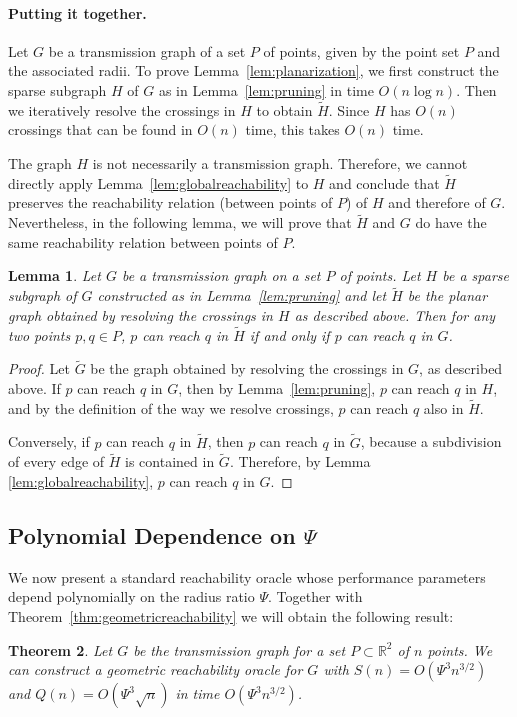 \documentclass[11pt,a4paper]{paper}
\newtheorem{theorem}{Theorem}[section]
\newtheorem{lemma}[theorem]{Lemma}
\newcommand{\mathset}[1]{\ensuremath {\mathbb {#1}}}
\newcommand{\R}{\mathset{R}}
\begin{document}
\paragraph*{Putting it together.}
Let $G$ be a transmission graph of a set $P$ of points, given 
by the point set $P$ and the associated radii.
To prove Lemma~\ref{lem:planarization}, we first construct the sparse
subgraph $H$ of $G$ as in Lemma~\ref{lem:pruning} in time $O(n \log n)$.
Then we iteratively resolve the crossings in $H$ to obtain
$\widetilde{H}$.
Since $H$ has $O(n)$ crossings that can be found in $O(n)$ time,
this takes $O(n)$ time.

The graph $H$ is not necessarily a transmission graph. Therefore, we cannot 
directly apply Lemma~\ref{lem:globalreachability} to $H$
and conclude that $\widetilde{H}$ preserves the reachability relation
(between points of $P$) of $H$ and therefore of
$G$. Nevertheless, in the following lemma, we will
prove  that $\widetilde{H}$ and $G$ do have the same reachability 
relation between points of $P$.
\begin{lemma}
Let $G$ be a transmission graph on a set $P$ of points. Let $H$ be a sparse subgraph of $G$ constructed  as in Lemma~\ref{lem:pruning}
and let $\widetilde{H}$ be the planar graph obtained by resolving the crossings in $H$ as described above.
Then for any two points  $p, q \in P$, $p$ can reach $q$ in $\widetilde{H}$ if and only if $p$
can reach $q$ in $G$.
\end{lemma}
\begin{proof}
Let $\widetilde{G}$ be the graph obtained by resolving the crossings
in $G$, as described above.  If $p$ can reach $q$ in $G$, then by 
Lemma~\ref{lem:pruning}, $p$ can reach $q$ in $H$, and by the definition of
the way we resolve  crossings, $p$ can reach $q$ also in $\widetilde{H}$.

Conversely,
if $p$ can reach $q$
in $\widetilde{H}$,
then $p$ can reach $q$ in $\widetilde{G}$, because a subdivision of every edge
of $\widetilde{H}$ is contained in $\widetilde{G}$. Therefore,
by Lemma \ref{lem:globalreachability}, $p$ can reach $q$ in $G$.
\end{proof}


\subsection{Polynomial Dependence on $\Psi$}
\label{sec:psiconst}
We now present a standard reachability oracle whose performance parameters
depend polynomially on the radius ratio $\Psi$.
Together with Theorem~\ref{thm:geometricreachability} we will obtain the
following result:
\begin{theorem}
\label{thm:2doraclefixed}
Let $G$ be the transmission graph for a set $P \subset \R^2$
of $n$ points.
We can construct a geometric reachability oracle for $G$
with $S(n) = O(\Psi^3 n^{3/2})$ and $Q(n) = O(\Psi^3\sqrt{n})$ in
time $O(\Psi^3 n^{3/2})$.
\end{theorem}
\end{document}
